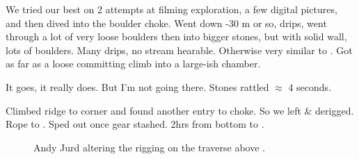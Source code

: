 We tried our best on 2 attempts at filming exploration, a few digital
pictures, and then dived into the boulder choke. Went down -30 m or so,
drips, went through a lot of very loose boulders then into bigger
stones, but with solid wall, lots of boulders. Many drips, no stream
hearable. Otherwise very similar to . Got as far as
a loose committing climb into a large-ish chamber.

It goes, it really does. But I'm not going there. Stones rattled
$\approx$ 4 seconds.

Climbed ridge to corner and found another entry to choke. So we left \& derigged. Rope to . Sped out once gear stashed.
2hrs from bottom to .



\begin{figure}
\checkoddpage \ifoddpage \forcerectofloat \else \forceversofloat \fi
\centering
 \caption{Andy Jurd altering the rigging on the traverse above \protect{}. }
 \label{Plopzilla traverse}
\end{figure}